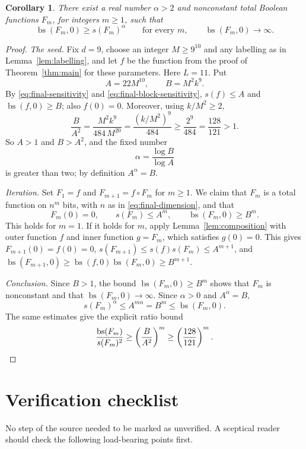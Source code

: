 \documentclass[11pt]{article}
\newcommand{\bs}{\operatorname{bs}}
\newtheorem{corollary}[theorem]{Corollary}
\theoremstyle{definition}
\theoremstyle{remark}
\begin{document}
\begin{corollary}
\label{cor:power-separation}
There exist a real number $\alpha>2$ and nonconstant total Boolean
functions $F_m$, for integers $m\geq1$, such that
\[
 \bs(F_m,0)\geq s(F_m)^\alpha
 \qquad\text{for every }m,
 \qquad
 \bs(F_m,0)\longrightarrow\infty.
\]
\end{corollary}

\begin{proof}
\emph{The seed.} Fix \(d=9\), choose an integer \(M\ge9^{10}\) and any
labelling as in Lemma~\ref{lem:labelling}, and let \(f\) be the function from
the proof of Theorem~\ref{thm:main} for these parameters. Here \(L=11\). Put
\[
 A=22M^{10},\qquad B=M^2k^9.
\]
By \eqref{eq:final-sensitivity} and \eqref{eq:final-block-sensitivity},
\(s(f)\le A\) and \(\bs(f,0)\ge B\); also \(f(0)=0\). Moreover, using
\(k/M^2\ge2\),
\[
 \frac{B}{A^2}
   =\frac{M^2k^9}{484\,M^{20}}
   =\frac{(k/M^2)^9}{484}
   \geq\frac{2^9}{484}
   =\frac{128}{121}>1.
\]
So \(A>1\) and \(B>A^2\), and the fixed number
\[
 \alpha=\frac{\log B}{\log A}
\]
is greater than two; by definition \(A^\alpha=B\).

\emph{Iteration.} Set \(F_1=f\) and \(F_{m+1}=f\circ F_m\) for \(m\ge1\).
We claim that \(F_m\) is a total function on \(n^m\) bits, with \(n\) as in
\eqref{eq:final-dimension}, and that
\[
 F_m(0)=0,\qquad s(F_m)\leq A^m,\qquad \bs(F_m,0)\geq B^m.
\]
This holds for \(m=1\). If it holds for \(m\), apply
Lemma~\ref{lem:composition} with outer function \(f\) and inner function
\(g=F_m\), which satisfies \(g(0)=0\). This gives \(F_{m+1}(0)=f(0)=0\),
\(s(F_{m+1})\le s(f)s(F_m)\le A^{m+1}\), and
\(\bs(F_{m+1},0)\ge\bs(f,0)\bs(F_m,0)\ge B^{m+1}\).

\emph{Conclusion.} Since \(B>1\), the bound \(\bs(F_m,0)\ge B^m\) shows that
\(F_m\) is nonconstant and that \(\bs(F_m,0)\to\infty\). Since \(\alpha>0\)
and \(A^\alpha=B\),
\[
 s(F_m)^\alpha\leq A^{m\alpha}=B^m\leq\bs(F_m,0).
\]
The same estimates give the explicit ratio bound
\[
 \frac{\bs(F_m)}{s(F_m)^2}
 \geq\left(\frac{B}{A^2}\right)^m
 \geq\left(\frac{128}{121}\right)^m.\qedhere
\]
\end{proof}

\section{Verification checklist}
\label{sec:checklist}

No step of the source needed to be marked as unverified. A sceptical reader should check
the following load-bearing points first.
\end{document}
